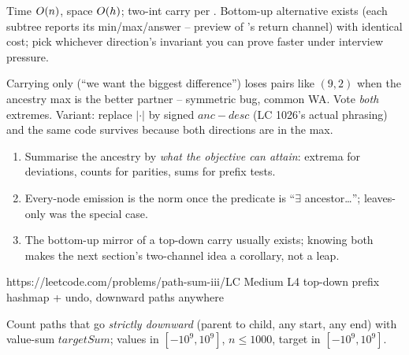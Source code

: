 \begin{complexitybox}
Time $O(n)$, space $O(h)$; two-int carry per .
Bottom-up alternative exists (each subtree reports its min/max/answer --
preview of 's return channel) with identical cost; pick
whichever direction's invariant you can prove faster under interview pressure.
\end{complexitybox}

\begin{warningbox}
Carrying only  (``we want the biggest difference'') loses pairs like
$(9,2)$ when the ancestry max is the better partner -- symmetric bug, common
WA. Vote \emph{both} extremes. Variant: replace $|\cdot|$ by signed
$\mathit{anc} - \mathit{desc}$ (LC 1026's actual phrasing) and the same code
survives because both directions are in the max.
\end{warningbox}

\begin{insightbox}
\begin{enumerate}[nosep, leftmargin=1.6em]
  \item Summarise the ancestry by \emph{what the objective can attain}: extrema
        for deviations, counts for parities, sums for prefix tests.
  \item Every-node emission is the norm once the predicate is
        ``$\exists$ ancestor\ldots''; leaves-only was the special case.
  \item The bottom-up mirror of a top-down carry usually exists; knowing both
        makes the next section's two-channel idea a corollary, not a leap.
\end{enumerate}
\end{insightbox}

  {https://leetcode.com/problems/path-sum-iii/}{LC Medium L4}
  {top-down prefix hashmap + undo, downward paths anywhere}

\begin{problemstatement}
Count paths that go \emph{strictly downward} (parent to child, any start, any
end) with value-sum $\mathit{targetSum}$; values in $[-10^9, 10^9]$,
$n \le 1000$, target in $[-10^9, 10^9]$.
\end{problemstatement}


